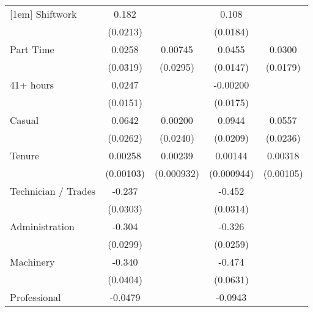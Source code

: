 {\begin{tabular}{l*{4}{c}}
[1em]
Shiftwork           &       0.182\sym{***}&                     &       0.108\sym{***}&                     \\
                    &    (0.0213)         &                     &    (0.0184)         &                     \\
[1em]
Part Time           &      0.0258         &     0.00745         &      0.0455\sym{**} &      0.0300         \\
                    &    (0.0319)         &    (0.0295)         &    (0.0147)         &    (0.0179)         \\
[1em]
41+ hours           &      0.0247         &                     &    -0.00200         &                     \\
                    &    (0.0151)         &                     &    (0.0175)         &                     \\
[1em]
Casual              &      0.0642\sym{*}  &     0.00200         &      0.0944\sym{***}&      0.0557\sym{*}  \\
                    &    (0.0262)         &    (0.0240)         &    (0.0209)         &    (0.0236)         \\
[1em]
Tenure              &     0.00258\sym{*}  &     0.00239\sym{*}  &     0.00144         &     0.00318\sym{**} \\
                    &   (0.00103)         &  (0.000932)         &  (0.000944)         &   (0.00105)         \\
[1em]
Technician / Trades &      -0.237\sym{***}&                     &      -0.452\sym{***}&                     \\
                    &    (0.0303)         &                     &    (0.0314)         &                     \\
[1em]
Administration      &      -0.304\sym{***}&                     &      -0.326\sym{***}&                     \\
                    &    (0.0299)         &                     &    (0.0259)         &                     \\
[1em]
Machinery           &      -0.340\sym{***}&                     &      -0.474\sym{***}&                     \\
                    &    (0.0404)         &                     &    (0.0631)         &                     \\
[1em]
Professional        &     -0.0479         &                     &     -0.0943\sym{***}&                     \\

\end{tabular}}
